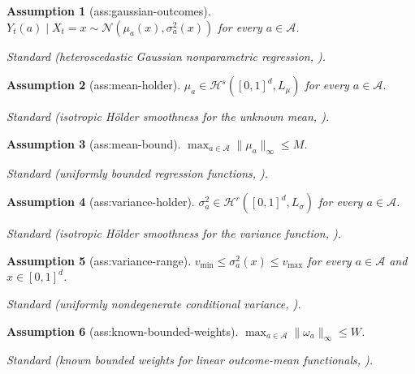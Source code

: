 \documentclass{article}
\newtheorem{assumption}{Assumption}
\begin{document}
\begin{assumption}[ass:gaussian-outcomes]\label{ass:gaussian-outcomes}
\(Y_t(a)\mid X_t=x\sim\mathcal N(\mu_a(x),\sigma_a^2(x))\) for every \(a\in\mathcal A\).
\par\smallskip\noindent\emph{Standard} (heteroscedastic Gaussian nonparametric regression, \cite{ShenGaoWittenHan2020Variance}).
\end{assumption}

\begin{assumption}[ass:mean-holder]\label{ass:mean-holder}
\(\mu_a\in\mathcal H^s([0,1]^d,L_{\mu})\) for every \(a\in\mathcal A\).
\par\smallskip\noindent\emph{Standard} (isotropic Hölder smoothness for the unknown mean, \cite{ShenGaoWittenHan2020Variance}).
\end{assumption}

\begin{assumption}[ass:mean-bound]\label{ass:mean-bound}
\(\max_{a\in\mathcal A}\|\mu_a\|_{\infty}\le M\).
\par\smallskip\noindent\emph{Standard} (uniformly bounded regression functions, \cite{LiSimchiLevi2026SequentialEfficiency}).
\end{assumption}

\begin{assumption}[ass:variance-holder]\label{ass:variance-holder}
\(\sigma_a^2\in\mathcal H^r([0,1]^d,L_{\sigma})\) for every \(a\in\mathcal A\).
\par\smallskip\noindent\emph{Standard} (isotropic Hölder smoothness for the variance function, \cite{ShenGaoWittenHan2020Variance}).
\end{assumption}

\begin{assumption}[ass:variance-range]\label{ass:variance-range}
\(v_{\min}\le\sigma_a^2(x)\le v_{\max}\) for every \(a\in\mathcal A\) and \(x\in[0,1]^d\).
\par\smallskip\noindent\emph{Standard} (uniformly nondegenerate conditional variance, \cite{LiSimchiLevi2026SequentialEfficiency}).
\end{assumption}

\begin{assumption}[ass:known-bounded-weights]\label{ass:known-bounded-weights}
\(\max_{a\in\mathcal A}\|\omega_a\|_{\infty}\le W\).
\par\smallskip\noindent\emph{Standard} (known bounded weights for linear outcome-mean functionals, \cite{LiSimchiLevi2026SequentialEfficiency}).
\end{assumption}
\end{document}
